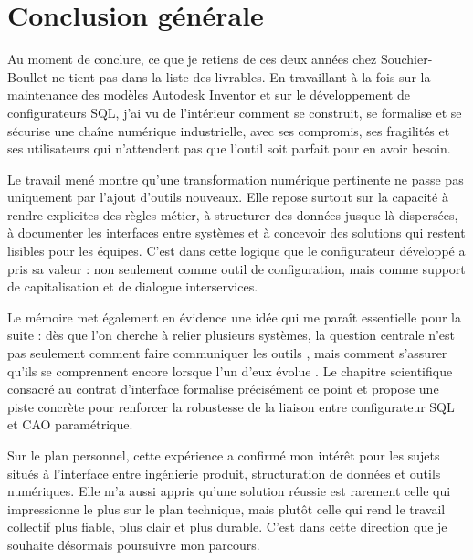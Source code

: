 \chapter{Conclusion générale}

Au moment de conclure, ce que je retiens de ces deux années chez Souchier-Boullet ne tient pas dans la liste des livrables. En travaillant à la fois sur la maintenance des modèles Autodesk Inventor et sur le développement de configurateurs SQL, j'ai vu de l'intérieur comment se construit, se formalise et se sécurise une chaîne numérique industrielle, avec ses compromis, ses fragilités et ses utilisateurs qui n'attendent pas que l'outil soit parfait pour en avoir besoin.

Le travail mené montre qu'une transformation numérique pertinente ne passe pas uniquement par l'ajout d'outils nouveaux. Elle repose surtout sur la capacité à rendre explicites des règles métier, à structurer des données jusque-là dispersées, à documenter les interfaces entre systèmes et à concevoir des solutions qui restent lisibles pour les équipes. C'est dans cette logique que le configurateur développé a pris sa valeur : non seulement comme outil de configuration, mais comme support de capitalisation et de dialogue interservices.

Le mémoire met également en évidence une idée qui me paraît essentielle pour la suite : dès que l'on cherche à relier plusieurs systèmes, la question centrale n'est pas seulement \og comment faire communiquer les outils \fg{}, mais \og comment s'assurer qu'ils se comprennent encore lorsque l'un d'eux évolue \fg{}. Le chapitre scientifique consacré au contrat d'interface formalise précisément ce point et propose une piste concrète pour renforcer la robustesse de la liaison entre configurateur SQL et CAO paramétrique.

Sur le plan personnel, cette expérience a confirmé mon intérêt pour les sujets situés à l'interface entre ingénierie produit, structuration de données et outils numériques. Elle m'a aussi appris qu'une solution réussie est rarement celle qui impressionne le plus sur le plan technique, mais plutôt celle qui rend le travail collectif plus fiable, plus clair et plus durable. C'est dans cette direction que je souhaite désormais poursuivre mon parcours.
